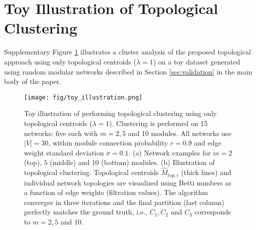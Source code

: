 \documentclass{article} %
\begin{document}
\section{Toy Illustration of Topological Clustering}

Supplementary Figure \ref{suppfig:toy_illustration} illustrates a cluster analysis of the proposed topological approach using only topological centroids ($\lambda = 1$) on a toy dataset generated using random modular networks described in Section \ref{sec:validation} in the main body of the paper.


\begin{figure}
\texttt{[image: fig/toy\_illustration.png]}
\centering
\caption{Toy illustration of performing topological clustering using only topological centroids ($\lambda =1$). Clustering is performed on 15 networks: five each with $m=2, 5$ and 10 modules. All networks use $|V|=30$, within module connection probability $r=0.9$ and edge weight standard deviation $\sigma=0.1$. (a) Network examples for $m=2$ (top), $5$ (middle) and $10$ (bottom) modules. (b) Illustration of topological clustering. Topological centroids $\widehat M_{top,i}$ (thick lines) and individual network topologies are visualized using Betti numbers as a function of edge weights (filtration values). The algorithm converges in three iterations and the final partition (last column) perfectly matches the ground truth, i.e., $C_1,C_2$ and $C_3$ corresponds to $m=2,5$ and 10.}
\label{suppfig:toy_illustration}
\end{figure}
\end{document}
